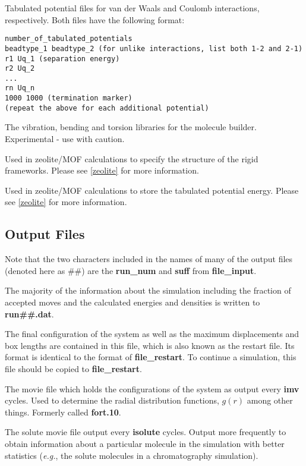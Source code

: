 \documentclass[12pt,letterpaper]{article}
\begin{document}
 Tabulated potential files
for van der Waals and Coulomb interactions, respectively.
Both files have the following format:
\begin{verbatim}
number_of_tabulated_potentials
beadtype_1 beadtype_2 (for unlike interactions, list both 1-2 and 2-1)
r1 Uq_1 (separation energy)
r2 Uq_2
...
rn Uq_n
1000 1000 (termination marker)
(repeat the above for each additional potential)
\end{verbatim}

 The vibration,
bending and torsion libraries for the molecule builder.
Experimental - use with caution.

 Used
in zeolite/MOF calculations to specify the structure of the
rigid frameworks. Please see \ref{zeolite} for more
information.

 Used in zeolite/MOF calculations
to store the tabulated potential energy. Please see
\ref{zeolite} for more information.

\subsection{Output Files}
\label{output}
Note that the two characters included in the names of many
of the output files (denoted here as \#\#) are the {\bf
  run\_num} and {\bf suff} from {\bf file\_input}.

 The majority of the information
about the simulation including the fraction of accepted
moves and the calculated energies and densities is written
to {\bf run\#\#.dat}.

 The final configuration of the
system as well as the maximum displacements and box lengths
are contained in this file, which is also known as the
restart file. Its format is identical to the format of {\bf
  file\_restart}. To continue a simulation, this file should
be copied to {\bf file\_restart}.

 The movie file which holds the
configurations of the system as output every {\bf imv}
cycles. Used to determine the radial distribution functions,
$g(r)$ among other things. Formerly called {\bf fort.10}.

 The solute movie file output
every {\bf isolute} cycles. Output more frequently to obtain
information about a particular molecule in the simulation
with better statistics ({\it e.g.}, the solute molecules in
a chromatography simulation).
\end{document}
